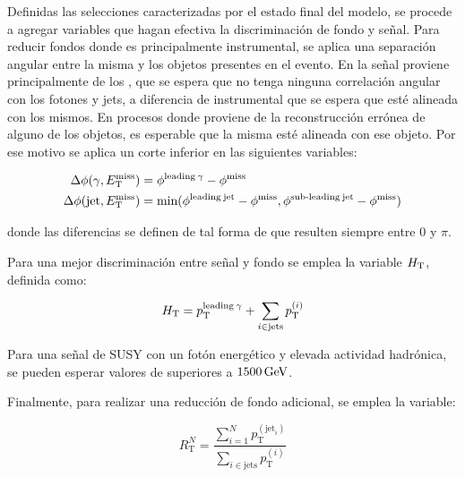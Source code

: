 
Definidas las selecciones caracterizadas por el estado final del modelo, se procede a agregar variables que hagan efectiva la discriminación de fondo y señal. Para reducir fondos donde \met es principalmente instrumental, se aplica una separación angular entre la misma y los objetos presentes en el evento. En la señal \met proviene principalmente de los \gravino, que se espera que no tenga ninguna correlación angular con los fotones y jets, a diferencia de \met instrumental que se espera que esté alineada con los mismos. En procesos donde \met proviene de la reconstrucción errónea de alguno de los objetos, es esperable que la misma esté alineada con ese objeto. Por ese motivo se aplica un corte inferior en las siguientes variables:

\begin{equation}
  \begin{split}
  \Delta\phi(\gamma, E_{\text{T}}^{\text{miss}}) & = \phi^{\text{leading}\: \gamma} - \phi^{\text{miss}} \\
  \Delta\phi(\text{jet}, E_{\text{T}}^{\text{miss}}) & = \text{min}(\phi^{\text{leading}\: \text{jet}} - \phi^{\text{miss}}, \phi^{\text{sub-leading}\: \text{jet}} - \phi^{\text{miss}}) \\
  \end{split}
\end{equation}

\noindent
donde las diferencias se definen de tal forma de que resulten siempre entre $0$ y $\pi$.

Para una mejor discriminación entre señal y fondo se emplea la variable $H_{\text{T}}$, definida como:

\begin{equation}
  H_{\text{T}} = p_{\text{T}}^{\text{leading}\: \gamma} + \sum_{i \in \text{jets}} p_{\text{T}}^{(i)}
\end{equation}

Para una señal de SUSY con un fotón energético y elevada actividad hadrónica, se pueden esperar valores de \HT superiores a $1500\,\text{GeV}$.

Finalmente, para realizar una reducción de fondo adicional, se emplea la variable:

\begin{equation}
  R_{\text{T}}^{N} = \frac{\sum_{i=1}^{N} p_{\text{T}}^{(\text{jet}_i)}}{\sum_{i \in \text{jets}} p_{\text{T}}^{(i)}}
\end{equation}

